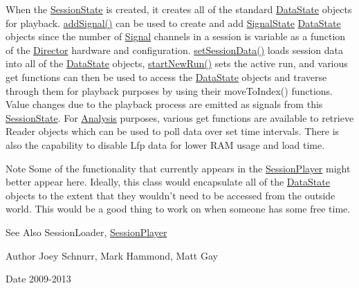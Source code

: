 When the \hyperlink{class_picto_1_1_session_state}{Session\-State} is created, it creates all of the standard \hyperlink{class_picto_1_1_data_state}{Data\-State} objects for playback. \hyperlink{class_picto_1_1_session_state_a7f5f14858c6ff2d727c1ba6017715633}{add\-Signal()} can be used to create and add \hyperlink{class_picto_1_1_signal_state}{Signal\-State} \hyperlink{class_picto_1_1_data_state}{Data\-State} objects since the number of \hyperlink{class_picto_1_1_signal}{Signal} channels in a session is variable as a function of the \hyperlink{class_director}{Director} hardware and configuration. \hyperlink{class_picto_1_1_session_state_a54ef9957c7c3f166de6bcc76f61b65f9}{set\-Session\-Data()} loads session data into all of the \hyperlink{class_picto_1_1_data_state}{Data\-State} objects, \hyperlink{class_picto_1_1_session_state_af2ce593d4016bd0e29ba90ba32cb3e15}{start\-New\-Run()} sets the active run, and various get functions can then be used to access the \hyperlink{class_picto_1_1_data_state}{Data\-State} objects and traverse through them for playback purposes by using their move\-To\-Index() functions. Value changes due to the playback process are emitted as signals from this \hyperlink{class_picto_1_1_session_state}{Session\-State}. For \hyperlink{class_picto_1_1_analysis}{Analysis} purposes, various get functions are available to retrieve Reader objects which can be used to poll data over set time intervals. There is also the capability to disable Lfp data for lower R\-A\-M usage and load time.

\begin{DoxyNote}{Note}
Some of the functionality that currently appears in the \hyperlink{class_picto_1_1_session_player}{Session\-Player} might better appear here. Ideally, this class would encapsulate all of the \hyperlink{class_picto_1_1_data_state}{Data\-State} objects to the extent that they wouldn't need to be accessed from the outside world. This would be a good thing to work on when someone has some free time. 
\end{DoxyNote}
\begin{DoxySeeAlso}{See Also}
Session\-Loader, \hyperlink{class_picto_1_1_session_player}{Session\-Player} 
\end{DoxySeeAlso}
\begin{DoxyAuthor}{Author}
Joey Schnurr, Mark Hammond, Matt Gay 
\end{DoxyAuthor}
\begin{DoxyDate}{Date}
2009-\/2013 
\end{DoxyDate}


